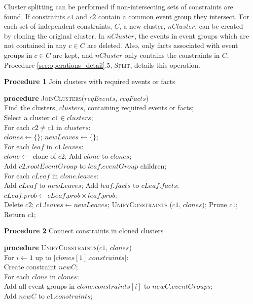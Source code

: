 Cluster splitting can be performed if non-intersecting sets of constraints are found. If constraints $c1$ and $c2$ contain a common event group they intersect. For each set of independent constraints, $C$, a new cluster, $nCluster$, can be created by cloning the original cluster. In $nCluster$, the events in event groups which are not contained in any $c \in C$ are deleted. Also, only facts associated with event groups in $c \in C$ are kept, and $nCluster$ only contains the constraints in $C$. Procedure \ref{sec:operations_detail}.5, \textsc{Split}, details this operation.

\vspace{-5mm}
\begin{snippet}
\textbf{Procedure 1} Join clusters with required events or facts\\  \hline

\textbf{procedure} \textsc{JoinClusters($reqEvents$, $reqFacts$)}\\
Find the clusters, $clusters$, containing required events or facts;\\
Select a cluster $c1 \in clusters$;\\
For each $c2 \neq c1$ in $clusters$:\\
\tab $clones \leftarrow \{\}$; $newLeaves \leftarrow \{\}$;\\
\tab For each $leaf$ in $c1.leaves$:\\
\tab \tab $clone \leftarrow$ clone of $c2$; Add $clone$ to $clones$;\\
\tab \tab Add $c2.rootEventGroup$ to $leaf.eventGroup$ children;\\
\tab \tab For each $cLeaf$ in $clone.leaves$:\\
\tab \tab \tab Add $cLeaf$ to $newLeaves$; Add $leaf.facts$ to $cLeaf.facts$;\\
\tab \tab \tab $cLeaf.prob \leftarrow cLeaf.prob \times leaf.prob$;\\
\tab Delete $c2$; $c1.leaves \leftarrow newLeaves$; \textsc{UnifyConstraints} ($c1$, $clones$); Prune $c1$;\\
Return $c1$;\\
\end{snippet}

\procedurespace
\begin{snippet}
\textbf{Procedure 2} Connect constraints in cloned clusters\\ \hline

\textbf{procedure} \textsc{UnifyConstraints($c1$, $clones$)}\\
For $i \leftarrow 1$ up to $|clones[1].constraints|$:\\
\tab Create constraint $newC$;\\
\tab For each $clone$ in $clones$:\\
\tab \tab Add all event groups in $clone.constraints[i]$ to $newC.eventGroups$;\\
\tab Add $newC$ to $c1.constraints$;\\
\end{snippet}

